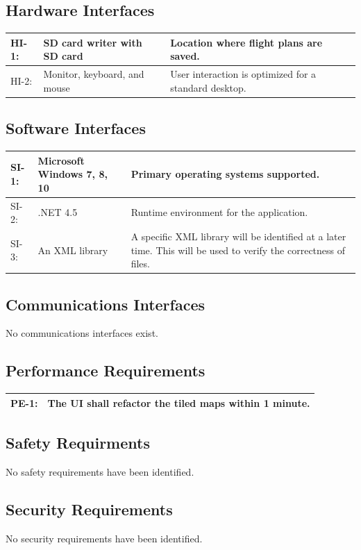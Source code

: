 \documentclass[12pt, letterpaper]{article}
\begin{document}
  \subsection{Hardware Interfaces}
    \begin{tabularx}{\textwidth}{|l|l|X|} \hline
      HI-1: & SD card writer with SD card & Location where flight plans are saved. \\ \hline
      HI-2: & Monitor, keyboard, and mouse & User interaction is optimized for a standard desktop. \\ \hline
    \end{tabularx}

  \subsection{Software Interfaces}
    \begin{tabularx}{\textwidth}{|l|l|X|} \hline
      SI-1: & Microsoft Windows 7, 8, 10 & Primary operating systems supported. \\ \hline
      SI-2: & .NET 4.5 & Runtime environment for the application. \\ \hline
      SI-3: & An XML library & A specific XML library will be identified at a later time.
        This will be used to verify the correctness of files. \\ \hline
    \end{tabularx}

  \subsection{Communications Interfaces}
  No communications interfaces exist.


  \subsection{Performance Requirements}
    \begin{tabularx}{\textwidth}{|l|X|} \hline
      PE-1: & The UI shall refactor the tiled maps within 1 minute. \\ \hline
    \end{tabularx}

  \subsection{Safety Requirments}
  No safety requirements have been identified.
  \subsection{Security Requirements}
  No security requirements have been identified.
\end{document}

